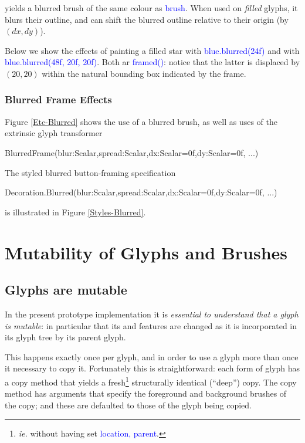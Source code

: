 \documentclass[12pt,a4paper]{article}
\def\Scala#1{\textcolor{blue}{\textsf{#1}}}
\def\S#1{\section{#1}}
\def\SS#1{\subsection{#1}}
\def\SSS#1{\subsubsection*{#1}}
\begin{document}
yields a blurred brush of the same colour as \Scala{brush}. When
used on \textit{filled} glyphs, it blurs their outline, and
can shift the blurred outline relative to their origin (by $(dx, dy)$).

Below we show the effects of painting a filled star with
\Scala{blue.blurred(24f)} and with \Scala{blue.blurred(48f, 20f, 20f)}.
Both ar \Scala{framed()}: notice that the latter is displaced by $(20, 20)$ within the
natural bounding box indicated by the frame.

\begin{center}
\quad\quad
{}
\end{center}



\SSS{Blurred Frame Effects}
Figure \ref{Etc-Blurred} shows the use of a blurred brush, as
well as uses of the extrinsic glyph transformer

\begin{scala}
   BlurredFrame(blur:Scalar,spread:Scalar,dx:Scalar=0f,dy:Scalar=0f, ...)
\end{scala}

The styled blurred button-framing specification 

\begin{scala}
   Decoration.Blurred(blur:Scalar,spread:Scalar,dx:Scalar=0f,dy:Scalar=0f, ...)
\end{scala}

is illustrated in Figure \ref{Styles-Blurred}.

\clearpage

\appendix
\S{Mutability of Glyphs and Brushes}
\SS{Glyphs are mutable}\label{glyphsaremutable}
In the present prototype implementation it is \textit{essential to understand that a glyph 
is mutable}: in particular that its  and  features are changed as it is
incorporated in its glyph tree by its parent glyph.

This happens exactly once per glyph, and in order to use a glyph
more than once it necessary to copy it. Fortunately this is
straightforward: each form of glyph has a copy method that yields
a fresh\footnote{\textit{ie.} without having set
\textcolor{blue}{\textsf{location, parent}}.} structurally identical
(``deep'') copy. The copy method has  arguments that
specify the foreground and background brushes of the copy; and these
are defaulted to those of the glyph being copied.
\end{document}
